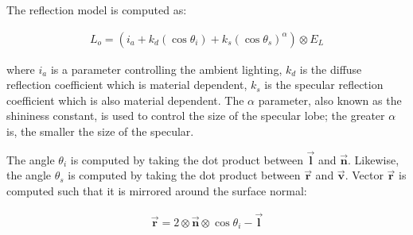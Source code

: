\noindent The reflection model is computed as:

	\begin{eqnarray*}
		L_o = (i_a + k_d(\cos\theta_i) + k_s(\cos\theta_s)^\alpha) \otimes E_L
	\end{eqnarray*}

\noindent where $i_a$ is a parameter controlling the ambient lighting, $k_d$ is the diffuse reflection coefficient which is material dependent, $k_s$ is the specular reflection coefficient which is also material dependent. The $\alpha$ parameter, also known as the shininess constant, is used to control the size of the specular lobe; the greater $\alpha$ is, the smaller the size of the specular. 

The angle $\theta_i$ is computed by taking the dot product between $\vec{\mathbf{l}}$ and $\vec{\mathbf{n}}$. Likewise, the angle $\theta_s$ is computed by taking the dot product between $\vec{\mathbf{r}}$ and $\vec{\mathbf{v}}$. Vector $\vec{\mathbf{r}}$ is computed such that it is mirrored around the surface normal:

	\begin{eqnarray*}
		\vec{\mathbf{r}} = 2 \otimes \vec{\mathbf{n}} \otimes \cos\theta_i - \vec{\mathbf{l}}
	\end{eqnarray*}




